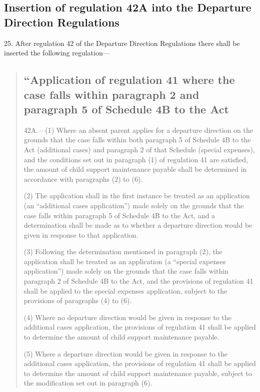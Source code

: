 \documentclass[12pt,a4paper]{article}
\begin{document}
\subsection[25. Insertion of regulation 42A into the Departure Direction Regulations]{Insertion of regulation 42A into the Departure Direction Regulations}

25.  After regulation 42 of the Departure Direction Regulations there shall be inserted the following regulation—
\begin{quotation}
\subsection*{“Application of regulation 41 where the case falls within paragraph 2 and paragraph 5 of Schedule 4B to the Act}

42A.—(1) Where an absent parent applies for a departure direction on the grounds that the case falls within both paragraph 5 of Schedule 4B to the Act (additional cases) and paragraph 2 of that Schedule (special expenses), and the conditions set out in paragraph (1) of regulation 41 are satisfied, the amount of child support maintenance payable shall be determined in accordance with paragraphs (2) to (6).

(2) The application shall in the first instance be treated as an application (an “additional cases application”) made solely on the grounds that the case falls within paragraph 5 of Schedule 4B to the Act, and a determination shall be made as to whether a departure direction would be given in response to that application.

(3) Following the determination mentioned in paragraph (2), the application shall be treated as an application (a “special expenses application”) made solely on the grounds that the case falls within paragraph 2 of Schedule 4B to the Act, and the provisions of regulation 41 shall be applied to the special expenses application, subject to the provisions of paragraphs (4) to (6).

(4) Where no departure direction would be given in response to the additional cases application, the provisions of regulation 41 shall be applied to determine the amount of child support maintenance payable.

(5) Where a departure direction would be given in response to the additional cases application, the provisions of regulation 41 shall be applied to determine the amount of child support maintenance payable, subject to the modification set out in paragraph (6).


\end{quotation}
\end{document}
